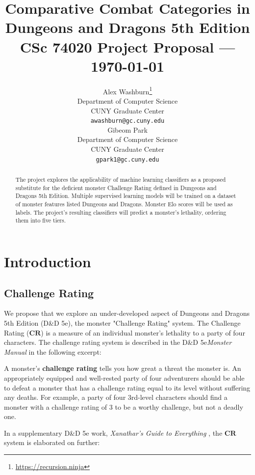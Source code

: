 \documentclass{article}
\title{Comparative Combat Categories in\\Dungeons and Dragons 5th Edition\\[5mm]\normalsize CSc 74020 Project Proposal --- \today}
\author{
  Alex Washburn\thanks{\url{https://recursion.ninja}} \\
  Department of Computer Science\\
  CUNY Graduate Center\\
  \texttt{awashburn@gc.cuny.edu} \\
  \And
  Gibeom Park\\
  Department of Computer Science\\
  CUNY Graduate Center\\
  \texttt{gpark1@gc.cuny.edu} \\
}
\newcommand{\CR}{\ensuremath{\mathbf{CR}}\xspace}
\newcommand{\DnD}{D\&D 5e\xspace}
\begin{document}


\maketitle

\begin{abstract}
The project explores the applicability of machine learning classifiers as a proposed substitute for the deficient monster Challenge Rating defined in Dungeons and Dragons 5th Edition.
Multiple supervised learning models will be trained on a dataset of monster features listed Dungeons and Dragons.
Monster Elo scores will be used as labels.
The project's resulting classifiers will predict a monster's lethality, ordering them into five tiers.
\end{abstract}

\section{Introduction}


\subsection{Challenge Rating}

We propose that we explore an under-developed aspect of Dungeons and Dragons 5th Edition (\DnD), the monster "Challenge Rating" system.
The Challenge Rating (\CR) is a measure of an individual monster’s lethality to a party of four characters.
The challenge rating system is described in the \DnD \emph{Monster Manual} \cite{DnD5eMonsterManual2014} in the following excerpt:

\begin{displayquote}
	A monster's \textbf{challenge rating} tells you how great a threat the monster is.
	An appropriately equipped and well-rested party of four adventurers should be able to
	defeat a monster that has a challenge rating equal to its level without suffering any deaths.
	For example, a party of four 3rd-level characters should find a monster with a challenge rating of 3 to be a worthy challenge, but not a deadly one.
\end{displayquote}

In a supplementary \DnD work, \emph{Xanathar's Guide to Everything} \cite{DnD5eXanathars2017}, the \CR system is elaborated on further:
\end{document}
